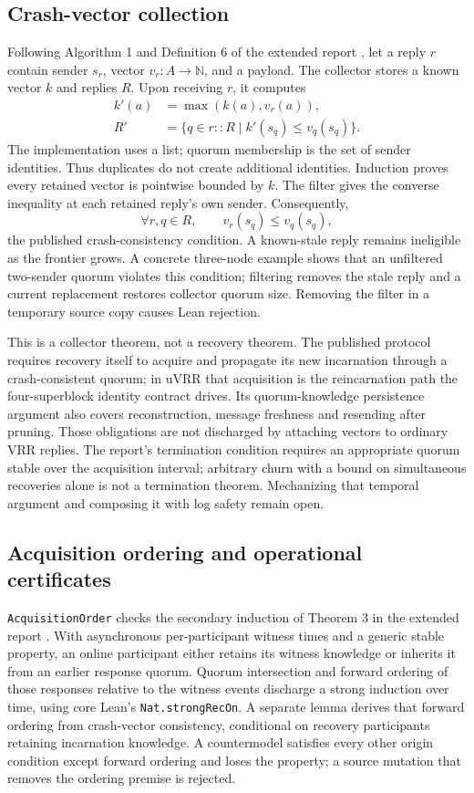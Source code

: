 \documentclass[10pt,journal,letterpaper]{IEEEtran}
\newcommand{\code}[1]{\texttt{\small #1}}
\begin{document}
\subsection{Crash-vector collection}
Following Algorithm 1 and Definition 6 of the extended report
\cite{recovery}, let a reply $r$ contain sender $s_r$, vector
$v_r:A\to\mathbb N$, and a payload. The collector stores a known vector $k$
and replies $R$. Upon receiving $r$, it computes
\[
\begin{aligned}
 k'(a)&=\max(k(a),v_r(a)),\\
 R'&=\{q\in r::R\mid k'(s_q)\le v_q(s_q)\}.
\end{aligned}
\]
The implementation uses a list; quorum membership is the set of sender
identities. Thus duplicates do not create additional identities. Induction
proves every retained vector is pointwise bounded by $k$. The filter gives
the converse inequality at each retained reply's own sender. Consequently,
\[
 \forall r,q\in R,\qquad v_r(s_q)\le v_q(s_q),
\]
the published crash-consistency condition. A known-stale reply remains
ineligible as the frontier grows. A concrete three-node example shows that
an unfiltered two-sender quorum violates this condition; filtering removes
the stale reply and a current replacement restores collector quorum size.
Removing the filter in a temporary source copy causes Lean rejection.

This is a collector theorem, not a recovery theorem. The published protocol
requires recovery itself to acquire and propagate its new incarnation through
a crash-consistent quorum; in uVRR that acquisition is the reincarnation path
the four-superblock identity contract drives. Its quorum-knowledge persistence argument also
covers reconstruction, message freshness and resending after pruning. Those
obligations are not discharged by attaching vectors to ordinary VRR replies.
The report's termination condition requires an appropriate quorum stable over
the acquisition interval; arbitrary churn with a bound on simultaneous
recoveries alone is not a termination theorem. Mechanizing that temporal
argument and composing it with log safety remain open.

\subsection{Acquisition ordering and operational certificates}
\texttt{AcquisitionOrder} checks the secondary induction of Theorem 3 in the
extended report \cite{recovery}. With asynchronous per-participant witness
times and a generic stable property, an online participant either retains its
witness knowledge or inherits it from an earlier response quorum. Quorum
intersection and forward ordering of those responses relative to the witness
events discharge a strong induction over time, using core Lean's
\code{Nat.strongRecOn}. A separate lemma derives that forward ordering from
crash-vector consistency, conditional on recovery participants retaining
incarnation knowledge. A countermodel satisfies every other origin condition
except forward ordering and loses the property; a source mutation that
removes the ordering premise is rejected.
\end{document}
